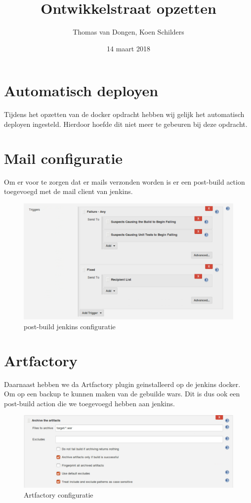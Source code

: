 \documentclass[12pt]{article}
\title{Ontwikkelstraat opzetten}
\author{Thomas van Dongen, Koen Schilders}
\date{14 maart 2018}
\begin{document}
\begin{titlepage}
\maketitle
\end{titlepage}

\section{Automatisch deployen}
Tijdens het opzetten van de docker opdracht hebben wij gelijk het automatisch deployen ingesteld. Hierdoor hoefde dit niet meer te gebeuren bij deze opdracht.

\section{Mail configuratie}
Om er voor te zorgen dat er mails verzonden worden is er een post-build action toegevoegd met de mail client van jenkins. 
\newline
\begin{figure}[H]
	\includegraphics[width=\textwidth]{images/emailsetting.png}
	\caption{post-build jenkins configuratie\label{fig:mail_conf}}
\end{figure}

\newpage
\section{Artfactory}
Daarnaast hebben we da Artfactory plugin geinstalleerd op de jenkins docker. Om op een backup te kunnen maken van de gebuilde wars. Dit is dus ook een post-build action die we toegevoegd hebben aan jenkins.

\begin{figure}[H]
	\includegraphics[width=\textwidth]{images/Archivesetting.png}
	\caption{Artfactory configuratie\label{fig:artfactory}}
\end{figure}
\end{document}
